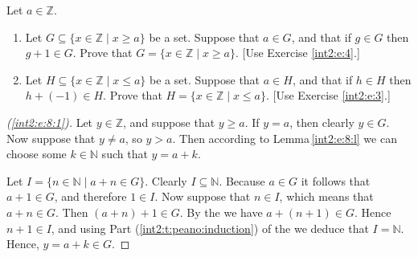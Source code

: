 \begin{exercise} %
	\label{int2:e:8}
	Let $a \in \mathbb{Z}$.
	\begin{enumerate}
		\item \label{int2:e:8:1}
		      Let $G \subseteq \{ x \in \mathbb{Z} \mid x \geq a \}$ be a set. Suppose that $a \in G$, and that if $g \in G$ then $g + 1 \in G$. Prove that $G = \{ x \in \mathbb{Z} \mid x \geq a \}$.
		      \hfill [Use Exercise \ref{int2:e:4}.]
		\item \label{int2:e:8:2}
		      Let $H \subseteq \{x \in \mathbb{Z} \mid x \leq a \}$ be a set. Suppose that $a \in H$, and that if $h \in H$ then $h + (-1) \in H$. Prove that $H = \{ x \in \mathbb{Z} \mid x \leq a \}$.
		      \hfill [Use Exercise \ref{int2:e:3}.]
	\end{enumerate}

\end{exercise}

\begin{proof}[(\ref{int2:e:8:1})]
	Let $y \in \mathbb{Z}$, and suppose that $y \geq a$. If $y = a$, then clearly $y \in G$. Now suppose that $y \not= a$, so $y > a$. Then according to Lemma\,\ref{int2:e:8:l} we can choose some $k \in \mathbb{N}$ such that $y = a + k$.

	Let $I = \{ n \in \mathbb{N} \mid a + n \in G \}$. Clearly $I \subseteq \mathbb{N}$. Because $a \in G$ it follows that $a + 1 \in G$, and therefore $1 \in I$. Now suppose that $n \in I$, which means that $a + n \in G$. Then $(a + n) + 1 \in G$. By the  we have $a + (n + 1) \in G$. Hence $n + 1 \in I$, and using Part (\ref{int2:t:peano:induction}) of the  we deduce that $I = \mathbb{N}$. Hence, $y = a + k \in G$.
\end{proof}

